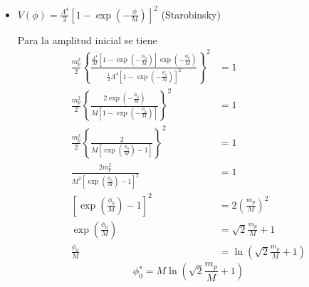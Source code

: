 \begin{itemize}
    Y la condición para la velocidad inicial sería
    \begin{equation*}
        \begin{split}
            \dot{\phi}_0 &= -\sqrt{\Lambda^4 \tanh^2 \left( \frac{\phi_0}{M} \right)}\\
            \dot{\phi}_0 &= - \Lambda^2 \tanh \left( \frac{\phi_0}{M} \right)
        \end{split}
    \end{equation*}
    \begin{equation}
        \dot{\phi}_0^{t2} = - \Lambda^2 \tanh \left[ \frac{1}{2} \text{arcsinh} \left( 2 \sqrt{2} \frac{m_p}{M} \right) \right]
    \end{equation}

    \newpage

    \item $\displaystyle V(\phi) = \frac{\Lambda^4}{2} \left[ 1 - \exp \left( - \frac{\phi}{M} \right) \right]^2$ (Starobinsky)
    
    Para la amplitud inicial se tiene
    \begin{equation*}
        \begin{split}
            \frac{m_p^2}{2} \left\{ \frac{\frac{\Lambda^4}{M} \left[ 1 - \exp \left( - \frac{\phi_0}{M} \right) \right] \exp \left( - \frac{\phi_0}{M} \right)}{\frac{1}{2} \Lambda^4 \left[ 1 - \exp \left(- \frac{\phi_0}{M} \right) \right]^2} \right\}^2 &= 1\\
            \frac{m_p^2}{2} \left\{ \frac{2 \exp \left(- \frac{\phi_0}{M} \right)}{M \left[ 1 - \exp \left(- \frac{\phi_0}{M} \right) \right]} \right\}^2 &= 1\\
            \frac{m_p^2}{2} \left\{ \frac{2}{M \left[ \exp \left(\frac{\phi_0}{M} \right) - 1 \right]} \right\}^2 &= 1\\
            \frac{2 m_p^2}{M^2 \left[ \exp \left(\frac{\phi_0}{M} \right) - 1 \right]^2} &= 1\\ 
            \left[ \exp \left(\frac{\phi_0}{M} \right) - 1 \right]^2 &= 2 \left( \frac{m_p}{M} \right)^2\\
            \exp \left( \frac{\phi_0}{M} \right) &= \sqrt{2} \frac{m_p}{M} + 1\\
            \frac{\phi_0}{M} &= \ln \left( \sqrt{2} \frac{m_p}{M} + 1 \right) 
        \end{split}
    \end{equation*}
    \begin{equation}
        \phi_0^{s} = M \ln \left( \sqrt{2} \frac{m_p}{M} + 1 \right)
    \end{equation}


\end{itemize}
